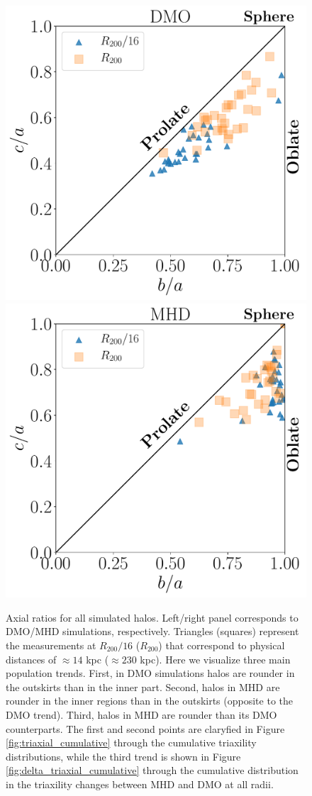 \documentclass[usenatbib]{mnras}
\begin{document}
 
\begin{figure}
\begin{center}
\includegraphics[width=0.8\columnwidth]{Lvl_4_Triax_Plane_DM.pdf}
\includegraphics[width=0.8\columnwidth]{Lvl_4_Triax_Plane_MHD.pdf}
\end{center}
\caption{Axial ratios for all simulated halos.
  Left/right panel corresponds to DMO/MHD simulations, respectively.
  Triangles (squares) represent the measurements at $R_{200}/16$
  ($R_{200}$) that correspond to physical distances of $\approx14$ kpc
  ($\approx 230$ kpc).
  Here we visualize three main population trends.
  First, in DMO simulations halos are rounder in the outskirts
  than in the inner part.
  Second, halos in MHD are rounder in the inner regions than in
  the outskirts (opposite to the DMO trend). 
  Third, halos in MHD are rounder than its DMO counterparts.
  The first and second points are claryfied in Figure
  \ref{fig:triaxial_cumulative} through the cumulative triaxility
  distributions, 
  while the third trend is shown in Figure
  \ref{fig:delta_triaxial_cumulative} through the cumulative
  distribution in the triaxility changes between MHD and DMO at all
  radii.}
  \label{fig:triaxiality_plane}
\end{figure}
\end{document}
